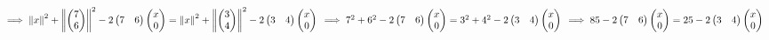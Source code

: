 \documentclass{article}
\begin{document}
\begin{math}
 \implies 
 \left\lVert  x \right\rVert^2 + \left\lVert\begin{pmatrix} 7 \\ 6 \\ \end{pmatrix} \right\rVert^2 - 2\begin{pmatrix} 7 & 6 \end{pmatrix}\begin{pmatrix} x \\ 0 \\ \end{pmatrix} = \left\lVert  x \right\rVert^2 + \left\lVert\begin{pmatrix} 3 \\ 4 \\ \end{pmatrix} \right\rVert^2 - 2\begin{pmatrix} 3 & 4 \end{pmatrix}\begin{pmatrix} x \\ 0 \\ \end{pmatrix}  \newline \newline \newline
 \implies 7^2 +6^2 - 2\begin{pmatrix} 7 & 6 \end{pmatrix}\begin{pmatrix} x \\ 0 \\ \end{pmatrix}  = 3^2 + 4^2 - 2\begin{pmatrix} 3 & 4 \end{pmatrix}\begin{pmatrix} x \\ 0 \\ \end{pmatrix} \newline \newline
 \implies 85 - 2\begin{pmatrix} 7 & 6 \end{pmatrix}\begin{pmatrix} x \\ 0 \\ \end{pmatrix} = 25 - 2\begin{pmatrix} 3 & 4 \end{pmatrix}\begin{pmatrix} x \\ 0 \\ \end{pmatrix} \newline \newline

\end{math}
\end{document}
